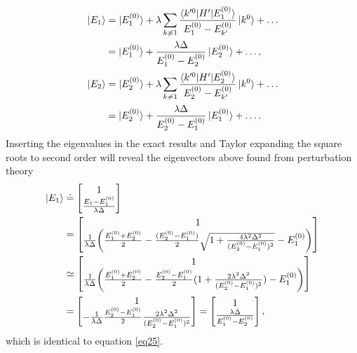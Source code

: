 \begin{example}
\begin{enumerate}
\begin{equation}
			\begin{split}
				&\ket{E_1}=\ket{E_1^{(0)}}+\lambda\sum_{k\neq 1}^{}\frac{\braket{k'^0|H'|E_1^{(0)}}}{E_1^{(0)}-E_{k'}^{(0)}}\ket{k^0}+\dots\\
				&\qquad=\ket{E_1^{(0)}}+\frac{\lambda\Delta}{E_1^{(0)}-E_{2}^{(0)}}\ket{E_2^{(0)}}+\dots,\\
				&\ket{E_2}=\ket{E_2^{(0)}}+\lambda\sum_{k\neq 1}^{}\frac{\braket{k'^0|H'|E_2^{(0)}}}{E_2^{(0)}-E_{k'}^{(0)}}\ket{k^0}+\dots\\
				&\qquad=\ket{E_2^{(0)}}+\frac{\lambda\Delta}{E_2^{(0)}-E_{1}^{(0)}}\ket{E_1^{(0)}}+\dots.
			\end{split}
			\label{eq25}
		\end{equation} 
		Inserting the eigenvalues in the exact results and Taylor expanding the square roots to second order will reveal the eigenvectors above found from perturbation theory
		\begin{equation}
			\begin{split}
				\ket{E_{1}}&\doteq\begin{bmatrix}
					1 \\
					\frac{E_{1}-E_1^{(0)}}{\lambda\Delta} \\
				\end{bmatrix}\\
				&=\begin{bmatrix}
					1 \\
					\frac{1}{\lambda\Delta}\bigg(\frac{E_1^{(0)}+E_2^{(0)}}{2}-\frac{(E_2^{(0)}-E_1^{(0)})}{2}\sqrt{1+\frac{4\lambda^2\Delta^2}{(E_2^{(0)}-E_1^{(0)})^2}}-E_1^{(0)}\bigg) \\
				\end{bmatrix}\\
				&\simeq\begin{bmatrix}
					1 \\
					\frac{1}{\lambda\Delta}\bigg(\frac{E_1^{(0)}+E_2^{(0)}}{2}-\frac{E_2^{(0)}-E_1^{(0)}}{2}(1+\frac{2\lambda^2\Delta^2}{(E_2^{(0)}-E_1^{(0)})^2})-E_1^{(0)}\bigg) \\
				\end{bmatrix}\\
				&=\begin{bmatrix}
					1 \\
					-\frac{1}{\lambda\Delta}\frac{E_2^{(0)}-E_1^{(0)}}{2}\frac{2\lambda^2\Delta^2}{(E_2^{(0)}-E_1^{(0)})^2} \\
				\end{bmatrix}=\begin{bmatrix}
					1 \\
					\frac{\lambda\Delta}{E_1^{(0)}-E_2^{(0)}} \\
				\end{bmatrix},
			\end{split}
		\end{equation} 
		which is identical to equation \eqref{eq25}.\newline
		

\end{enumerate}
\end{example}
